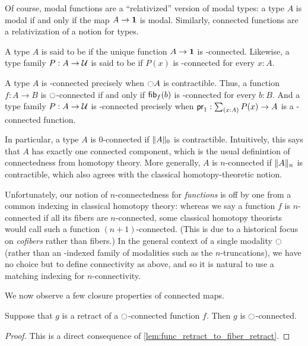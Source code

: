 Of course, modal functions are a ``relativized'' version of modal types: a type $A$ is modal if and only if the map $A\to \unit$ is modal.
Similarly, connected functions are a relativization of a notion for types.

\begin{defn}
  A type $A$ is said to be  if the unique function $A\to\unit$ is \modal-connected.
  Likewise, a type family $P:A\to\type$ is said to be  if $P(x)$ is \modal-connected for every $x:A$. 
\end{defn}

A type $A$ is \modal-connected precisely when $\modal A$ is contractible. Thus, a function $f:A\to B$ is
$\modal$-connected if and only if $\hfib{f}b$ is \modal-connected for every $b:B$. 
And a type family $P:A\to\type$ is \modal-connected precisely when $\proj1:\sm{x:A} P(x)\to A$ is a \modal-connected function.

\begin{eg}
  In particular, a type $A$ is $0$-connected if $\trunc0A$ is contractible.
  Intuitively, this says that $A$ has exactly one connected component, which is the usual definintion of connectedness from homotopy theory.
  More generally, $A$ is $n$-connected if $\trunc nA$ is contractible, which also agrees with the classical homotopy-theoretic notion.

  Unfortunately, our notion of $n$-connectedness for \emph{functions} is off by one from a common indexing in classical homotopy theory: whereas we say a function $f$ is $n$-connected if all its fibers are $n$-connected, some classical homotopy theorists would call such a function $(n+1)$-connected.
  (This is due to a historical focus on \emph{cofibers} rather than fibers.)
  In the general context of a single modality $\modal$ (rather than an \nat-indexed family of modalities such as the $n$-truncations), we have no choice but to define connectivity as above, and so it is natural to use a matching indexing for $n$-connectivity.
\end{eg}

We now observe a few closure properties of connected maps.

\begin{lem}
Suppose that $g$ is a retract of a $\modal$-connected function $f$.  Then $g$ is
$\modal$-connected.
\end{lem}
\begin{proof}
This is a direct consequence of \autoref{lem:func_retract_to_fiber_retract}.
\end{proof}

